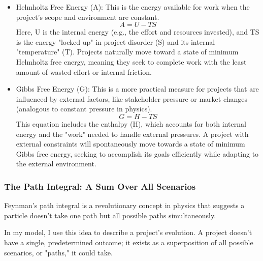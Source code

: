 \documentclass{article}
\begin{document}
\begin{itemize}
\item Helmholtz Free Energy (A): This is the energy available for work when the project's scope and environment are constant.
\begin{equation}
A = U - TS
\end{equation}
Here, U is the internal energy (e.g., the effort and resources invested), and TS is the energy "locked up" in project disorder (S) and its internal "temperature" (T). Projects naturally move toward a state of minimum Helmholtz free energy, meaning they seek to complete work with the least amount of wasted effort or internal friction.
\item Gibbs Free Energy (G): This is a more practical measure for projects that are influenced by external factors, like stakeholder pressure or market changes (analogous to constant pressure in physics).
\begin{equation}
G = H - TS
\end{equation}
This equation includes the enthalpy (H), which accounts for both internal energy and the "work" needed to handle external pressures. A project with external constraints will spontaneously move towards a state of minimum Gibbs free energy, seeking to accomplish its goals efficiently while adapting to the external environment.
\end{itemize}

\subsubsection*{The Path Integral: A Sum Over All Scenarios}
Feynman's path integral is a revolutionary concept in physics that suggests a particle doesn't take one path but all possible paths simultaneously. 

In my model, I use this idea to describe a project's evolution. A project doesn't have a single, predetermined outcome; it exists as a superposition of all possible scenarios, or "paths," it could take.
\end{document}

